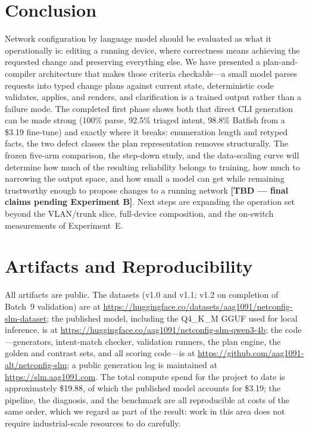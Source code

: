 \documentclass[conference]{IEEEtran}
\begin{document}
\section{Conclusion}
\label{sec:conclusion}

Network configuration by language model should be evaluated as what it operationally is: editing a running device, where correctness means achieving the requested change and preserving everything else. We have presented a plan-and-compiler architecture that makes those criteria checkable---a small model parses requests into typed change plans against current state, deterministic code validates, applies, and renders, and clarification is a trained output rather than a failure mode. The completed first phase shows both that direct CLI generation can be made strong (100\% parse, 92.5\% triaged intent, 98.8\% Batfish from a \$3.19 fine-tune) and exactly where it breaks: enumeration length and retyped facts, the two defect classes the plan representation removes structurally. The frozen five-arm comparison, the step-down study, and the data-scaling curve will determine how much of the resulting reliability belongs to training, how much to narrowing the output space, and how small a model can get while remaining trustworthy enough to propose changes to a running network \textbf{[TBD --- final claims pending Experiment B]}. Next steps are expanding the operation set beyond the VLAN/trunk slice, full-device composition, and the on-switch measurements of Experiment~E.

\section{Artifacts and Reproducibility}
\label{sec:artifacts}

All artifacts are public. The datasets (v1.0 and v1.1; v1.2 on completion of Batch~9 validation) are at \url{https://huggingface.co/datasets/aag1091/netconfig-slm-dataset}; the published model, including the Q4\_K\_M GGUF used for local inference, is at \url{https://huggingface.co/aag1091/netconfig-slm-qwen3-4b}; the code---generators, intent-match checker, validation runners, the plan engine, the golden and contrast sets, and all scoring code---is at \url{https://github.com/aag1091-alt/netconfig-slm}; a public generation log is maintained at \url{https://slm.aag1091.com}. The total compute spend for the project to date is approximately \$19.88, of which the published model accounts for \$3.19; the pipeline, the diagnosis, and the benchmark are all reproducible at costs of the same order, which we regard as part of the result: work in this area does not require industrial-scale resources to do carefully.



\end{document}
